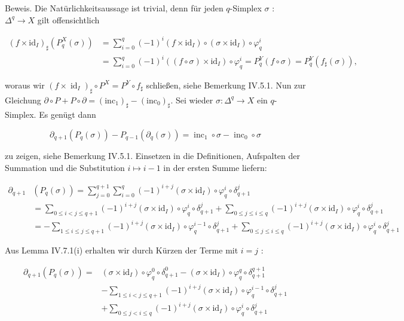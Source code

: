 \documentclass[10pt, letterpaper]{article}
\begin{document}
Beweis. Die Natürlichkeitsaussage ist trivial, denn für jeden $q$-Simplex $\sigma$ : $\Delta^q \rightarrow X$ gilt offensichtlich

$$
\begin{aligned}
\left(f \times \mathrm{id}_I\right)_{\sharp}\left(P_q^X(\sigma)\right) & =\sum_{i=0}^q(-1)^i\left(f \times \mathrm{id}_I\right) \circ\left(\sigma \times \mathrm{id}_I\right) \circ \varphi_q^i \\
& =\sum_{i=0}^q(-1)^i\left((f \circ \sigma) \times \mathrm{id}_I\right) \circ \varphi_q^i=P_q^Y(f \circ \sigma)=P_q^Y\left(f_{\sharp}(\sigma)\right),
\end{aligned}
$$

woraus wir $\left(f \times \operatorname{id}_I\right)_{\sharp} \circ P^X=P^Y \circ f_{\sharp}$ schließen, siehe Bemerkung IV.5.1.
Nun zur Gleichung $\partial \circ P+P \circ \partial=\left(\mathrm{inc}_1\right)_{\sharp}-\left(\mathrm{inc}_0\right)_{\sharp}$. Sei wieder $\sigma: \Delta^q \rightarrow X$ ein $q$-Simplex. Es genügt dann

$$
\partial_{q+1}\left(P_q(\sigma)\right)-P_{q-1}\left(\partial_q(\sigma)\right)=\operatorname{inc}_1 \circ \sigma-\operatorname{inc}_0 \circ \sigma
$$

zu zeigen, siehe Bemerkung IV.5.1. Einsetzen in die Definitionen, Aufspalten der Summation und die Substitution $i \mapsto i-1$ in der ersten Summe liefern:

$$
\begin{aligned}
\partial_{q+1} & \left(P_q(\sigma)\right)=\sum_{j=0}^{q+1} \sum_{i=0}^q(-1)^{i+j}\left(\sigma \times \mathrm{id}_I\right) \circ \varphi_q^i \circ \delta_{q+1}^j \\
& =\sum_{0 \leq i<j \leq q+1}(-1)^{i+j}\left(\sigma \times \mathrm{id}_I\right) \circ \varphi_q^i \circ \delta_{q+1}^j+\sum_{0 \leq j \leq i \leq q}(-1)^{i+j}\left(\sigma \times \mathrm{id}_I\right) \circ \varphi_q^i \circ \delta_{q+1}^j \\
& =-\sum_{1 \leq i \leq j \leq q+1}(-1)^{i+j}\left(\sigma \times \mathrm{id}_I\right) \circ \varphi_q^{i-1} \circ \delta_{q+1}^j+\sum_{0 \leq j \leq i \leq q}(-1)^{i+j}\left(\sigma \times \mathrm{id}_I\right) \circ \varphi_q^i \circ \delta_{q+1}^j
\end{aligned}
$$

Aus Lemma IV.7.1(i) erhalten wir durch Kürzen der Terme mit $i=j$ :

$$
\begin{aligned}
\partial_{q+1}\left(P_q(\sigma)\right)= & \left(\sigma \times \mathrm{id}_I\right) \circ \varphi_q^0 \circ \delta_{q+1}^0-\left(\sigma \times \mathrm{id}_I\right) \circ \varphi_q^q \circ \delta_{q+1}^{q+1} \\
& -\sum_{1 \leq i<j \leq q+1}(-1)^{i+j}\left(\sigma \times \mathrm{id}_I\right) \circ \varphi_q^{i-1} \circ \delta_{q+1}^j \\
& +\sum_{0 \leq j<i \leq q}(-1)^{i+j}\left(\sigma \times \mathrm{id}_I\right) \circ \varphi_q^i \circ \delta_{q+1}^j
\end{aligned}
$$
\end{document}
